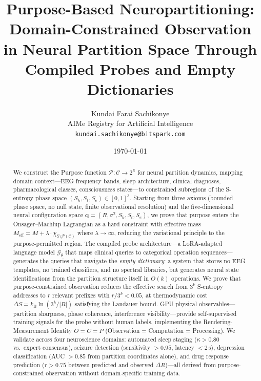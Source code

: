 \documentclass[aps,prd,twocolumn,superscriptaddress,floatfix,nofootinbib]{revtex4-2}
\theoremstyle{remark}
\newcommand{\kB}{k_{\mathrm{B}}}
\newcommand{\Sk}{S_k}
\newcommand{\St}{S_t}
\newcommand{\Se}{S_e}
\newcommand{\qvec}{\mathbf{q}}
\newcommand{\Purpose}{\mathcal{P}}
\newcommand{\Context}{\mathcal{C}}
\newcommand{\Sspace}{\mathbb{S}}
\newcommand{\Probe}{\mathcal{G}}
\newcommand{\Meff}{M_{\mathrm{eff}}}
\begin{document}
\title{Purpose-Based Neuropartitioning: Domain-Constrained Observation in Neural Partition Space Through Compiled Probes and Empty Dictionaries}

\author{
Kundai Farai Sachikonye\\
AIMe Registry for Artificial Intelligence\\
\texttt{kundai.sachikonye@bitspark.com}
}

\date{\today}

\begin{abstract}
We construct the Purpose function $\Purpose\colon \Context \to 2^{\Sspace}$ for neural partition dynamics, mapping domain context---EEG frequency bands, sleep architecture, clinical diagnoses, pharmacological classes, consciousness states---to constrained subregions of the S-entropy phase space $(\Sk, \St, \Se) \in [0,1]^3$.
Starting from three axioms (bounded phase space, no null state, finite observational resolution) and the five-dimensional neural configuration space $\qvec = (R, \sigma^2, \Sk, \St, \Se)$, we prove that purpose enters the Onsager--Machlup Lagrangian as a hard constraint with effective mass $\Meff = M + \lambda \cdot \chi_{\Sspace \setminus \Purpose(\Context)}$ where $\lambda \to \infty$, reducing the variational principle to the purpose-permitted region.
The compiled probe architecture---a LoRA-adapted language model $\Probe_\theta$ that maps clinical queries to categorical operation sequences---generates the queries that navigate the \emph{empty dictionary}: a system that stores no EEG templates, no trained classifiers, and no spectral libraries, but generates neural state identifications from the partition structure itself in $O(k)$ operations.
We prove that purpose-constrained observation reduces the effective search from $3^k$ S-entropy addresses to $r$ relevant prefixes with $r/3^k < 0.05$, at thermodynamic cost $\Delta S = \kB \ln(3^k / |R|)$ satisfying the Landauer bound.
GPU physical observables---partition sharpness, phase coherence, interference visibility---provide self-supervised training signals for the probe without human labels, implementing the Rendering-Measurement Identity $O = C = P$ (Observation = Computation = Processing).
We validate across four neuroscience domains: automated sleep staging ($\kappa > 0.80$ vs.\ expert consensus), seizure detection (sensitivity $> 0.95$, latency $< 2$\,s), depression classification (AUC $> 0.85$ from partition coordinates alone), and drug response prediction ($r > 0.75$ between predicted and observed $\Delta R$)---all derived from purpose-constrained observation without domain-specific training data.
\end{abstract}
\end{document}
